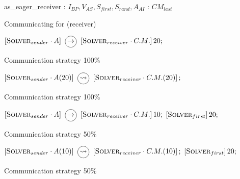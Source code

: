 \begin{algorithm}
\dontprintsemicolon
\SetNoline
{}
   as\_eager\_receiver\;
\algoindent {} : $I_{BP}, V_{AS}, S_{first}, S_{rand}, A_{AI}$ \;
\algoindent {} : $CM_{last}$
\caption{Communicating \as{} for \SGP{} (receiver)}\label{as:golfers_receiver}
\end{algorithm}

\begin{algorithm}
\dontprintsemicolon
\SetNoline
$\left[\eqsolverposl{sender}\cdot A\right] \onetoone \left[\eqsolverposl{receiver}\cdot C.M.\right]20;$
\caption{Communication strategy \oneTone{} 100\%}\label{comm:golfers_1_1-1}
\end{algorithm}

\begin{algorithm}
\dontprintsemicolon
\SetNoline
$\left[\eqsolverposl{sender}\cdot A(20)\right] \oneton \left[\eqsolverposl{receiver}\cdot C.M.(20)\right];$
\caption{Communication strategy \oneTn{} 100\%}\label{comm:golfers_1_1-n}
\end{algorithm}

\begin{algorithm}
\dontprintsemicolon
\SetNoline
$\left[\eqsolverposl{sender}\cdot A\right] \onetoone \left[\eqsolverposl{receiver}\cdot C.M.\right]10;$\;
$\left[\textbf{{\sc Solver}}_{first}\right]20;$
\caption{Communication strategy \oneTone{} 50\%}\label{comm:golfers_1_1-1_50}
\end{algorithm}

\begin{algorithm}
\dontprintsemicolon
\SetNoline
$\left[\eqsolverposl{sender}\cdot A(10)\right] \oneton \left[\eqsolverposl{receiver}\cdot C.M.(10)\right];$\;
$\left[\textbf{{\sc Solver}}_{first}\right]20;$
\caption{Communication strategy \oneTn{} 50\%}\label{comm:golfers_1_1-n_50}
\end{algorithm}

